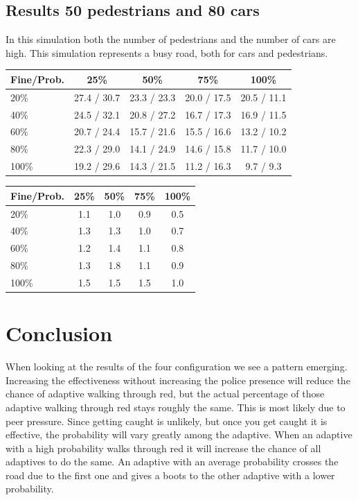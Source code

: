 \documentclass[a4paper]{article}
\begin{document}
\subsection{Results 50 pedestrians and 80 cars}
In this simulation both the number of pedestrians and the number of cars are high. This simulation represents a busy road, both for cars and pedestrians.

\begin{table}[H]
\centering
\begin{tabular}{ l | c c c c }
  Fine\slash Prob. & 25\% & 50\% & 75\% & 100\% \\ 
  \hline
  20\%  & 27.4 / 30.7 & 23.3 / 23.3 & 20.0 / 17.5 & 20.5 / 11.1  \\
  40\%  & 24.5 / 32.1 & 20.8 / 27.2 & 16.7 / 17.3 & 16.9 / 11.5  \\
  60\%  & 20.7 / 24.4 & 15.7 / 21.6 & 15.5 / 16.6 & 13.2 / 10.2  \\
  80\%  & 22.3 / 29.0 & 14.1 / 24.9 & 14.6 / 15.8 & 11.7 / 10.0  \\
  100\% & 19.2 / 29.6 & 14.3 / 21.5 & 11.2 / 16.3 &  9.7 /  9.3  \\
\end{tabular}
\end{table}

\begin{table}[H]
\centering
\begin{tabular}{ l | c c c c }
  Fine\slash Prob. & 25\% & 50\% & 75\% & 100\% \\ 
  \hline
  20\%  & 1.1 & 1.0 & 0.9 & 0.5  \\
  40\%  & 1.3 & 1.3 & 1.0 & 0.7  \\
  60\%  & 1.2 & 1.4 & 1.1 & 0.8  \\
  80\%  & 1.3 & 1.8 & 1.1 & 0.9  \\
  100\% & 1.5 & 1.5 & 1.5 & 1.0  \\
\end{tabular}
\end{table}

\clearpage

\section{Conclusion}
When looking at the results of the four configuration we see a pattern emerging. Increasing the effectiveness without increasing the police presence will reduce the chance of adaptive walking through red, but the actual percentage of those adaptive walking through red stays roughly the same. This is most likely due to peer pressure. Since getting caught is unlikely, but once you get caught it is effective, the probability will vary greatly among the adaptive. When an adaptive with a high probability walks through red it will increase the chance of all adaptives to do the same. An adaptive with an average probability crosses the road due to the first one and gives a boots to the other adaptive with a lower probability.
\end{document}
